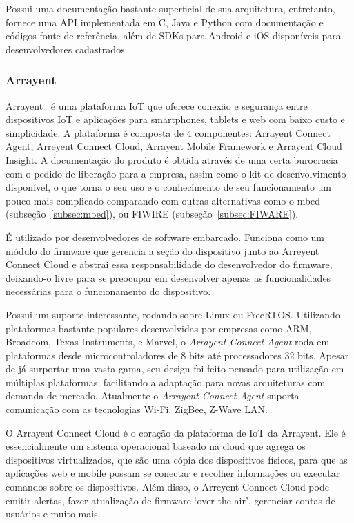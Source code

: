 Possui uma documentação bastante superficial de sua arquitetura, entretanto, fornece uma API implementada
em C, Java e Python com documentação e códigos fonte de referência, além de SDKs para Android e iOS
disponíveis para desenvolvedores cadastrados.

\subsubsection{Arrayent}
Arrayent~\cite{arrayent} é uma plataforma IoT que oferece conexão e segurança entre dispositivos IoT e aplicações
para  smartphones, tablets e web com baixo custo e simplicidade. A plataforma é composta de 4 componentes:
Arrayent Connect Agent, Arreyent Connect Cloud, Arrayent Mobile Framework e Arrayent Cloud Insight.
A documentação do produto é obtida através de uma certa burocracia com o pedido de liberação para
a empresa, assim como o kit de desenvolvimento disponível, o que torna o seu uso e o
conhecimento de seu funcionamento um pouco mais complicado comparando com outras alternativas como o
mbed (subseção~\ref{subsec:mbed}), ou FIWIRE (subseção~\ref{subsec:FIWARE}).

É utilizado por desenvolvedores de software embarcado. Funciona como um módulo do firmware que gerencia a
seção do dispositivo junto ao Arreyent Connect Cloud e abstrai essa responsabilidade do desenvolvedor
do firmware, deixando-o livre para se preocupar em desenvolver apenas as funcionalidades necessárias para o
funcionamento do dispositivo.

Possui um suporte interessante, rodando sobre Linux ou FreeRTOS. Utilizando plataformas bastante populares
desenvolvidas por empresas como ARM, Broadcom, Texas Instruments, e Marvel, o \textit{Arrayent Connect Agent} roda
em plataformas desde microcontroladores de 8 bits até processadores 32 bits. Apesar de já surportar
uma vasta gama, seu design foi feito pensado para utilização em múltiplas plataformas, facilitando a
adaptação para novas arquiteturas com demanda de mercado. Atualmente o \textit{Arrayent Connect Agent}
suporta comunicação com as tecnologias Wi-Fi, ZigBee, Z-Wave LAN.

O Arrayent Connect Cloud é o coração da plataforma de IoT da Arrayent. Ele é essencialmente um sistema
operacional baseado na cloud que agrega os dispositivos virtualizados, que são uma cópia dos dispositivos
físicos, para que as aplicações web e mobile possam se conectar e recolher informações ou executar comandos
sobre os dispositivos. Além disso, o Arreyent Connect Cloud pode emitir alertas, fazer atualização de firmware
\lq over-the-air\rq, gerenciar contas de usuários e muito mais.

